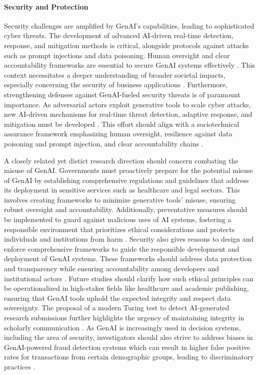 \paragraph{Security and Protection}
Security challenges are amplified by GenAI's capabilities, leading to sophisticated cyber threats. The development of advanced AI-driven real-time detection, response, and mitigation methods is critical, alongside protocols against attacks such as prompt injections and data poisoning. Human oversight and clear accountability frameworks are essential to secure GenAI systems effectively \parencite{R03,S17}. 
This context necessitates a deeper understanding of broader societal impacts, especially concerning the security of business applications \parencite{R10}.
Furthermore, strengthening defenses against GenAI-fueled security threats is of paramount importance. As adversarial actors exploit generative tools to scale cyber attacks, new AI-driven mechanisms for real-time threat detection, adaptive response, and mitigation must be developed \parencite{R03}. This effort should align with a sociotechnical assurance framework emphasizing human oversight, resilience against data poisoning and prompt injection, and clear accountability chains \parencite{S17}.

A closely related yet distict research direction should concern combating the misuse of GenAI. 
Governments must proactively prepare for the potential misuse of GenAI by establishing comprehensive regulations and guidelines that address its deployment in sensitive services such as healthcare and legal sectors. This involves creating frameworks to minimize generative tools' misuse, ensuring robust oversight and accountability. Additionally, preventative measures should be implemented to guard against malicious uses of AI systems, fostering a responsible environment that prioritizes ethical considerations and protects individuals and institutions from harm \parencite{R08}.
Security also gives reasons to design and enforce comprehensive frameworks to guide the responsible development and deployment of GenAI systems. These frameworks should address data protection and transparency while ensuring accountability among developers and institutional actors \parencite{S11, S12}. Future studies should clarify how such ethical principles can be operationalized in high-stakes fields like healthcare and academic publishing, ensuring that GenAI tools uphold the expected integrity and respect data sovereignty. The proposal of a modern Turing test to detect AI-generated research submissions further highlights the urgency of maintaining integrity in scholarly communication \parencite{R06}.
As GenAI is increasingly used in decision systems, including the area of security, investigators should also strive to address biases in GenAI-powered fraud detection systems which can result in higher false positive rates for transactions from certain demographic groups, leading to discriminatory practices \parencite{R01}.


